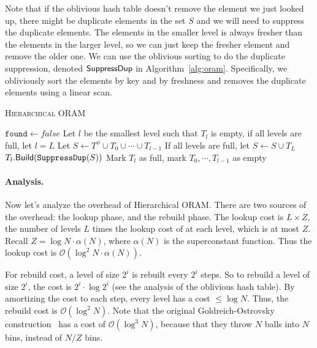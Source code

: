 Note that if the oblivious hash table doesn't remove the element we just looked up, there might be duplicate elements in the set $S$ and we will need to suppress the duplicate elements.
The elements in the smaller level is always fresher than the elements in the larger level, so we can just keep the fresher element and remove the older one.
We can use the oblivious sorting to do the duplicate
suppression, denoted ${\sf SuppressDup}$
in Algorithm~\ref{alg:oram}. 
Specifically, we obliviously sort 
the elements by key and by 
freshness and removes the duplicate elements using a linear scan.


\begin{algorithm}[h]
  \caption{\textsc{Hierarchical ORAM}}
  \label{alg:oram}
 
 $\texttt{found} \leftarrow false$\;
 Let $l$ be the smallest level such that $T_l$ is empty, if all levels are full, let $l = L$\;
 Let $S \leftarrow T^\phi \cup T_0 \cup \cdots \cup T_{l-1}$\;
 If all levels are full, let $S \leftarrow S \cup T_L$\;
 $T_l.{\sf Build}(\texttt{SuppressDup}(S))$\;
 Mark $T_l$ as full, mark $T_0, \cdots, T_{l-1}$ as empty\;
 \end{algorithm}

\paragraph{Analysis.} Now let's analyze the overhead of Hierarchical ORAM. There are two sources of the overhead: the lookup phase, and the rebuild phase.
The lookup cost is $L \times Z$, the number of levels $L$ times the lookup cost of at each level, which is at most $Z$. Recall $Z = \log N \cdot \alpha(N)$, where $\alpha(N)$ is the superconstant function. Thus the lookup cost is $\mathcal{O}(\log^2 N \cdot \alpha(N))$.

For rebuild cost, a level of size $2^i$ is rebuilt every $2^i$ steps.
So to rebuild a level of size $2^i$, the cost is $2^i \cdot \log 2^i$ (see the analysis of the oblivious hash table).
By amortizing the cost to each step, every level has a cost $\leq \log N$.
Thus, the rebuild cost is $\mathcal{O}(\log^2 N)$.
Note that the original Goldreich-Ostrovsky construction~\cite{10.1145/233551.233553} has a cost of $\mathcal{O}(\log^3 N)$, because that they throw $N$ balls into $N$ bins, instead of $N/Z$ bins.
